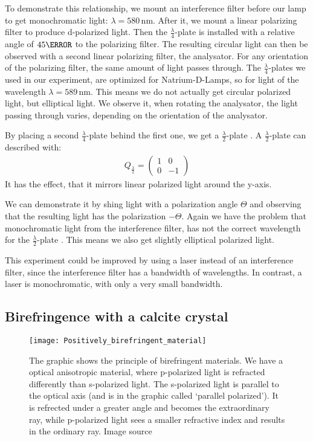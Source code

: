 \documentclass[a4paper,10pt,twocolumn]{article}
\newcommand{\quaterWavePlate}{$\frac{\lambda}{4}$-plate }
\newcommand{\quaterWavePlates}{$\frac{\lambda}{4}$-plates }
\newcommand{\halfWavePlate}{$\frac{\lambda}{2}$-plate }
\newcommand{\unit}[1]{\, \mathrm{#1}}
\newcommand{\nm}{\unit{nm}}
\newcommand{\wavelengthYellow}{580 \nm}
\begin{document}
    To demonstrate this relationship, we mount an interference filter before our lamp
    to get monochromatic light: $\lambda = \wavelengthYellow$.
    After it, we mount a linear polarizing filter to produce d-polarized light.
    Then the \quaterWavePlate is installed with a relative angle of $45 \degree$ to the polarizing filter.
    The resulting circular light can then be observed with a second linear polarizing filter, the analysator.
    For any orientation of the polarizing filter, the same amount of light passes through.
    The \quaterWavePlates we used in our experiment, are optimized for Natrium-D-Lamps,
    so for light of the wavelength $\lambda = 589 \nm$.
    This means we do not actually get circular polarized light, but elliptical light.
    We observe it, when rotating the analysator, the light passing through varies, depending on
    the orientation of the analysator.
    
    By placing a second \quaterWavePlate behind the first one, we get a \halfWavePlate.
    A \halfWavePlate can described with:
    \begin{align*}
        Q_{\frac{\lambda}{2}} = \begin{pmatrix} 1 & 0 \\ 0 & -1 \end{pmatrix}
    \end{align*}
    It has the effect, that it mirrors linear polarized light around the y-axis.
    
    We can demonstrate it by shing light with a polarization angle $\Theta$ and observing 
    that the resulting light has the polarization $-\Theta$.
    Again we have the problem that monochromatic light from the interference filter, has
    not the correct wavelength for the \halfWavePlate.
    This means we also get slightly elliptical polarized light.
    
    This experiment could be improved by using a laser instead of an interference filter,
    since the interference filter has a bandwidth of wavelengths.
    In contrast, a laser is monochromatic, with only a very small bandwidth.
    
    \subsection{Birefringence with a calcite crystal}

    \begin{figure}[htbp]
        \texttt{[image: Positively\_birefringent\_material]}
        \centering
        \caption{
        The graphic shows the principle of birefringent materials.
        We have a optical anisotropic material, where p-polarized light is refracted
        differently than s-polarized light.
        The s-polarized light is parallel to the optical axis (and is in the graphic called
            `parallel polarized').
        It is refrected under a greater angle and becomes the extraordinary ray,
            while p-polarized light sees a smaller refractive index and results in
        the ordinary ray. Image source~\cite{birefringenceGraphic}}
        \label{fig:birefringent}
    \end{figure}
    
\end{document}
